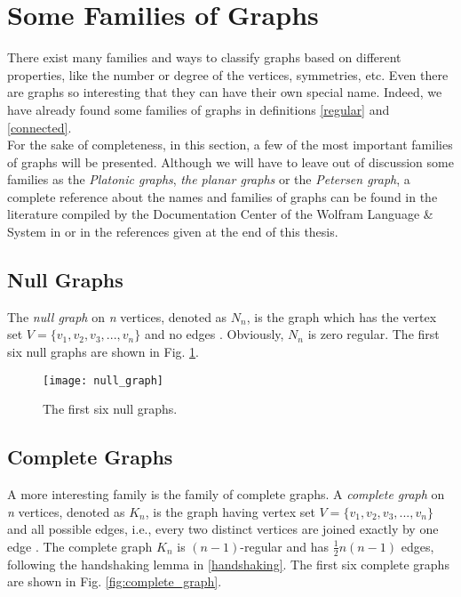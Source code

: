 \section{Some Families of Graphs}
There exist many families and ways to classify graphs based on different properties, like the number or degree of the vertices, symmetries, etc. Even there are graphs so interesting that they can have their own special name. Indeed, we have already found some families of graphs in definitions \ref{regular} and \ref{connected}.\\

For the sake of completeness, in this section, a few of the most important families of graphs will be presented. Although we will have to leave out of discussion some families as the \textit{Platonic graphs}, \textit{the planar graphs} or the \textit{Petersen graph}, a complete reference about the names and families of graphs can be found in the literature compiled by the Documentation Center of the Wolfram Language \& System in \cite{graphfamilies} or in the references given at the end of this thesis.

\subsection{Null Graphs}
The \textit{null graph} on \textit{n} vertices, denoted as $N_{n}$, is the graph which has the vertex set $V= \{v_{1},v_{2},v_{3},...,v_{n} \}$ and no edges \cite{trudeau}. Obviously, $N_{n}$ is zero regular. The first six null graphs are shown in Fig. \ref{fig:null_graph}.

\begin{figure}
	\centering
		\texttt{[image: null\_graph]}
	\caption{The first six null graphs.}
	\label{fig:null_graph}
\end{figure}

\subsection{Complete Graphs}
A more interesting family is the family of complete graphs. A \textit{complete graph}  on \textit{n} vertices, denoted as $K_{n}$, is the graph having vertex set $V=\{v_{1},v_{2},v_{3},...,v_{n}\}$ and all possible edges, i.e., every two distinct vertices are joined exactly by one edge \cite{trudeau}. The complete graph $K_{n}$ is $(n-1)$-regular and has $\frac{1}{2} n(n-1)$ edges, following the handshaking lemma in \ref{handshaking}. The first six complete graphs are shown in Fig. \ref{fig:complete_graph}.

